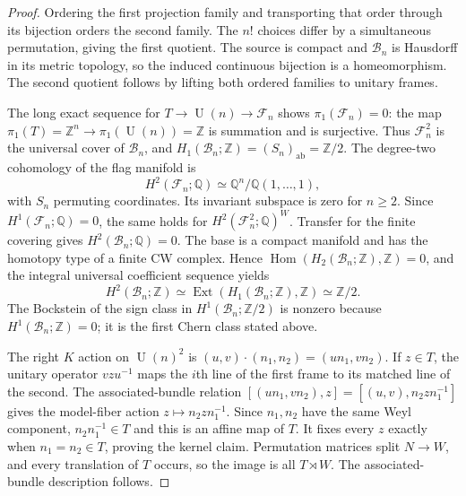\documentclass[10pt,a4paper]{amsart}
\newcommand{\U}{\operatorname{U}}
\newcommand{\Z}{\mathbb Z}
\begin{document}
\begin{proof}
Ordering the first projection family and transporting that order
through its bijection orders the second family. The $n!$ choices differ
by a simultaneous permutation, giving the first quotient. The source
is compact and $\mathcal B_n$ is Hausdorff in its metric topology, so
the induced continuous bijection is a homeomorphism. The second
quotient follows by lifting both ordered families to unitary frames.

The long exact sequence for $T\to\U(n)\to\mathcal F_n$ shows
$\pi_1(\mathcal F_n)=0$: the map
$\pi_1(T)=\Z^n\to\pi_1(\U(n))=\Z$ is summation and is surjective.
Thus $\mathcal F_n^2$ is the universal cover of $\mathcal B_n$,
and $H_1(\mathcal B_n;\Z)=(S_n)_{\mathrm{ab}}=\Z/2$.
The degree-two cohomology of the flag manifold is
\[
 H^2(\mathcal F_n;\mathbb Q)
 \simeq\mathbb Q^n/\mathbb Q(1,\ldots,1),
\]
with $S_n$ permuting coordinates. Its invariant subspace is zero for
$n\geq2$. Since $H^1(\mathcal F_n;\mathbb Q)=0$, the same holds for
$H^2(\mathcal F_n^2;\mathbb Q)^W$. Transfer for the finite covering
gives $H^2(\mathcal B_n;\mathbb Q)=0$. The base is a compact manifold
and has the homotopy type of a finite CW complex. Hence
$\operatorname{Hom}(H_2(\mathcal B_n;\Z),\Z)=0$, and the integral
universal coefficient sequence yields
\[
 H^2(\mathcal B_n;\Z)
 \simeq\operatorname{Ext}(H_1(\mathcal B_n;\Z),\Z)
 \simeq\Z/2.
\]
The Bockstein of the sign class in $H^1(\mathcal B_n;\Z/2)$ is nonzero
because $H^1(\mathcal B_n;\Z)=0$; it is the first Chern class stated
above.

The right $K$ action on $\U(n)^2$ is
$(u,v)\cdot(n_1,n_2)=(un_1,vn_2)$. If $z\in T$, the unitary operator
$vzu^{-1}$ maps the $i$th line of the first frame to its matched line
of the second. The associated-bundle relation
$[(un_1,vn_2),z]=[(u,v),n_2zn_1^{-1}]$ gives the model-fiber action
$z\mapsto n_2zn_1^{-1}$. Since $n_1,n_2$ have the same
Weyl component, $n_2n_1^{-1}\in T$ and this is an affine map of $T$.
It fixes every $z$ exactly when $n_1=n_2\in T$, proving the kernel
claim. Permutation matrices split $N\to W$, and every translation of
$T$ occurs, so the image is all $T\rtimes W$. The associated-bundle
description follows.
\end{proof}
\end{document}
